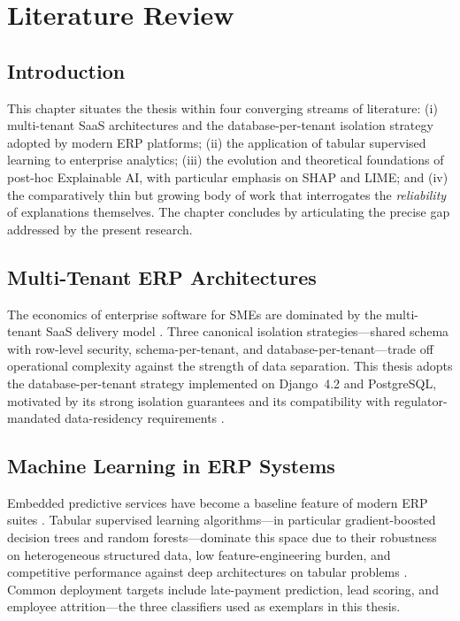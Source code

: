\chapter{Literature Review}
\label{ch:literature_review}

\section{Introduction}
\label{sec:lit_intro}

This chapter situates the thesis within four converging streams of literature: (i) multi-tenant SaaS architectures and the database-per-tenant isolation strategy adopted by modern ERP platforms; (ii) the application of tabular supervised learning to enterprise analytics; (iii) the evolution and theoretical foundations of post-hoc Explainable AI, with particular emphasis on SHAP and LIME; and (iv) the comparatively thin but growing body of work that interrogates the \emph{reliability} of explanations themselves. The chapter concludes by articulating the precise gap addressed by the present research.

\section{Multi-Tenant ERP Architectures}
\label{sec:lit_mt_erp}

The economics of enterprise software for SMEs are dominated by the multi-tenant SaaS delivery model \citep{bezemer2010multi, krebs2014multitenancy}. Three canonical isolation strategies---shared schema with row-level security, schema-per-tenant, and database-per-tenant---trade off operational complexity against the strength of data separation. This thesis adopts the database-per-tenant strategy implemented on Django~4.2 and PostgreSQL, motivated by its strong isolation guarantees and its compatibility with regulator-mandated data-residency requirements \citep{haddara2011erp}.

\section{Machine Learning in ERP Systems}
\label{sec:lit_ml_erp}

Embedded predictive services have become a baseline feature of modern ERP suites \citep{idc2024ai}. Tabular supervised learning algorithms---in particular gradient-boosted decision trees \citep{chen2016xgboost} and random forests---dominate this space due to their robustness on heterogeneous structured data, low feature-engineering burden, and competitive performance against deep architectures on tabular problems \citep{lundberg2020local}. Common deployment targets include late-payment prediction, lead scoring, and employee attrition---the three classifiers used as exemplars in this thesis.


